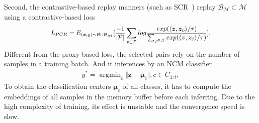Second, the contrastive-based replay manners (such as SCR~\cite{mai2021supervised}) replay $\mathcal{B}_\mathcal{M}\subset\mathcal{M}$ using a contrastive-based loss
\begin{equation}\small
\begin{split}
    \label{eq:scrloss}   
L_{PCR}=E_{(\bm{x},y)\sim{\mathcal{B}}\cup\mathcal{B}_\mathcal{M}}
    [\frac{-1}{|\mathcal{P}|}\sum_{p\in \mathcal{P}}
    log\frac{exp(\langle \bm{z},\bm{z}_p\rangle/\tau)}{\sum_{j\in {\mathcal{J}}}exp(\langle \bm{z},\bm{z}_j\rangle/\tau)}].
\end{split}
\end{equation} 
Different from the proxy-based loss, the selected pairs rely on the number of samples in a training batch. And it inferences by an NCM classifier
\begin{equation}
 	\begin{split}
	 	y^* = \mathop{\arg\min}_{c}\Vert\bm{z}-\bm{\mu}_c\Vert,c\in C_{1:t},
 	\end{split}
\end{equation}
To obtain the classification centers $\bm{\mu}_c$ of all classes, it has to compute the embeddings of all samples in the memory buffer before each inferring. Due to the high complexity of training, its effect is unstable and the convergence speed is slow.





